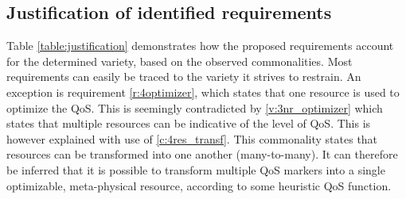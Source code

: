 \subsection{Justification of identified requirements}
Table \ref{table:justification} demonstrates how the proposed requirements account for the determined variety, based on the observed commonalities. Most requirements can easily be traced  to the variety it strives to restrain. An exception is requirement \ref{r:4optimizer}, which states that one resource is used to optimize the QoS. This is seemingly contradicted by \ref{v:3nr_optimizer} which states that multiple resources can be indicative of the level of QoS. This is however explained with use of \ref{c:4res_transf}. This commonality states that resources can be transformed into one another (many-to-many). It can therefore be inferred that it is possible to transform multiple QoS markers into a single optimizable, meta-physical resource, according to some heuristic QoS function.

